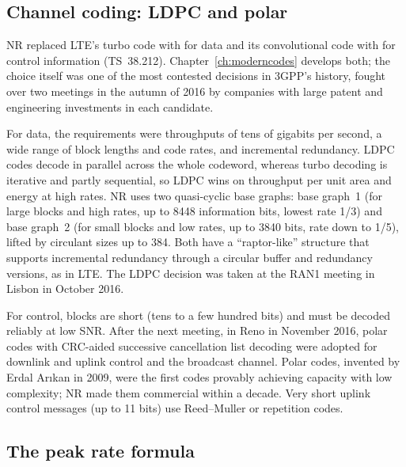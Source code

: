 \subsection{Channel coding: LDPC and polar}
\label{sec:ch21:nrcoding}

NR replaced LTE's turbo code with  for data and its convolutional code with
 for control information (TS~38.212). Chapter~\ref{ch:moderncodes} develops both;
the choice itself was one of the most contested decisions in 3GPP's history, fought over two
meetings in the autumn of 2016 by companies with large patent and engineering investments in each
candidate.


For data, the requirements were throughputs of tens of gigabits per second, a wide range of block
lengths and code rates, and incremental redundancy. LDPC codes decode in parallel across the whole
codeword, whereas turbo decoding is iterative and partly sequential, so LDPC wins on throughput per
unit area and energy at high rates. NR uses two quasi-cyclic base graphs: base graph~1 (for large
blocks and high rates, up to 8448 information bits, lowest rate 1/3) and base graph~2 (for small
blocks and low rates, up to 3840 bits, rate down to 1/5), lifted by circulant sizes up to 384. Both
have a ``raptor-like'' structure that supports incremental redundancy through a circular buffer and
redundancy versions, as in LTE. The LDPC decision was taken at the RAN1 meeting in Lisbon in October
2016.

For control, blocks are short (tens to a few hundred bits) and must be decoded reliably at low SNR.
After the next meeting, in Reno in November 2016, polar codes with CRC-aided successive cancellation
list decoding were adopted for downlink and uplink control and the broadcast channel. Polar codes,
invented by Erdal Ar\i{}kan in 2009, were the first codes provably achieving capacity with low
complexity; NR made them commercial within a decade. Very short uplink control messages (up to 11
bits) use Reed--Muller or repetition codes.

\subsection{The peak rate formula}

